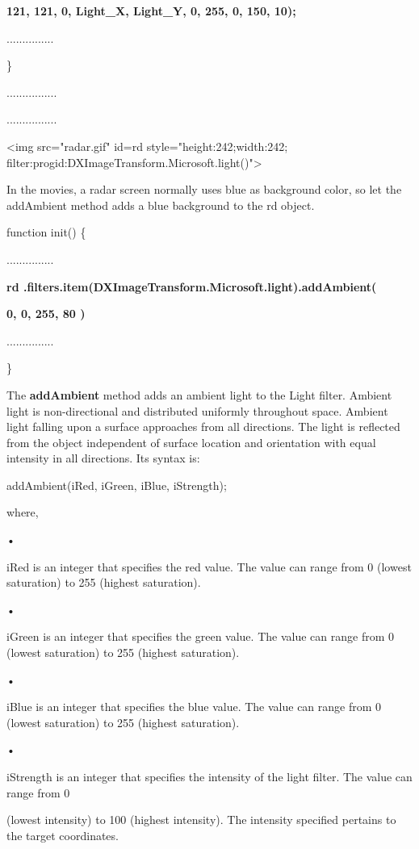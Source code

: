 \documentclass[
]{article}
\begin{document}
\textbf{121, 121, 0, Light\_X, Light\_Y, 0, 255, 0, 150, 10);}

...............

\}

................

................

\textless img src="radar.gif" id=rd style="height:242;width:242;
filter:progid:DXImageTransform.Microsoft.light()"\textgreater{}

In the movies, a radar screen normally uses blue as background color, so
let the addAmbient method adds a blue background to the rd object.

function init() \{

...............

\textbf{rd
.filters.item(\textquotesingle DXImageTransform.Microsoft.light\textquotesingle).addAmbient(}

\textbf{0, 0, 255, 80 )}

...............

\}

The \textbf{addAmbient} method adds an ambient light to the Light
filter. Ambient light is non-directional and distributed uniformly
throughout space. Ambient light falling upon a surface approaches from
all directions. The light is reflected from the object independent of
surface location and orientation with equal intensity in all directions.
Its syntax is:

addAmbient(iRed, iGreen, iBlue, iStrength);

where,

•

iRed is an integer that specifies the red value. The value can range
from 0 (lowest saturation) to 255 (highest saturation).

•

iGreen is an integer that specifies the green value. The value can range
from 0 (lowest saturation) to 255 (highest saturation).

•

iBlue is an integer that specifies the blue value. The value can range
from 0 (lowest saturation) to 255 (highest saturation).

•

iStrength is an integer that specifies the intensity of the light
filter. The value can range from 0

(lowest intensity) to 100 (highest intensity). The intensity specified
pertains to the target coordinates.
\end{document}
